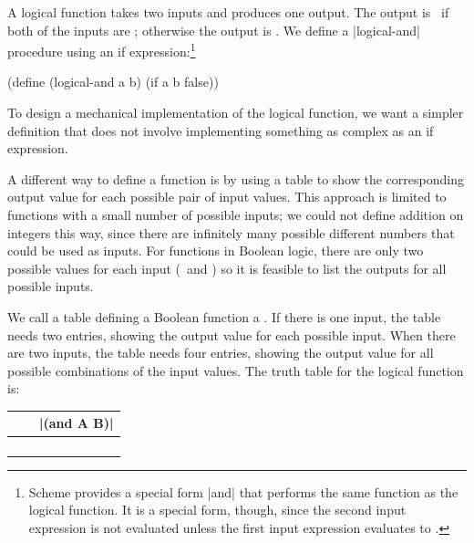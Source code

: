 \begin{schemeregion}
  A logical  function takes two inputs and produces one output.  The output is \true\ if both of the inputs are \true; otherwise the output is \false.  We define a \scheme|logical-and| procedure using an if expression:\footnote{Scheme provides a special form \scheme|and| that performs the same function as the logical  function.  It is a special form, though, since the second input expression is not evaluated unless the first input expression evaluates to \true.}
\begin{schemedisplay}
(define (logical-and a b) (if a b false))
\end{schemedisplay}

To design a mechanical implementation of the logical  function, we want a simpler definition that does not involve implementing something as complex as an if expression.  

A different way to define a function is by using a table to show the corresponding output value for each possible pair of input values.  This approach is limited to functions with a small number of possible inputs; we could not define addition on integers this way, since there are infinitely many possible different numbers that could be used as inputs.  For functions in Boolean logic, there are only two possible values for each input (\true\ and \false) so it is feasible to list the outputs for all possible inputs.

We call a table defining a Boolean function a .  If there is one input, the table needs two entries, showing the output value for each possible input.  When there are two inputs, the table needs four entries, showing the output value for all possible combinations of the input values.  The truth table for the logical  function is:

\begin{center}
	\begin{tabular}{cc|c} %
		\var{A} &  \var{B} & \scheme|(and A B)| \\ \hline
		\false & \false & \false \\
		\true & \false & \false \\
		\false & \true & \false \\
		\true & \true & \true \\ %
	\end{tabular}
\end{center}


\end{schemeregion}
